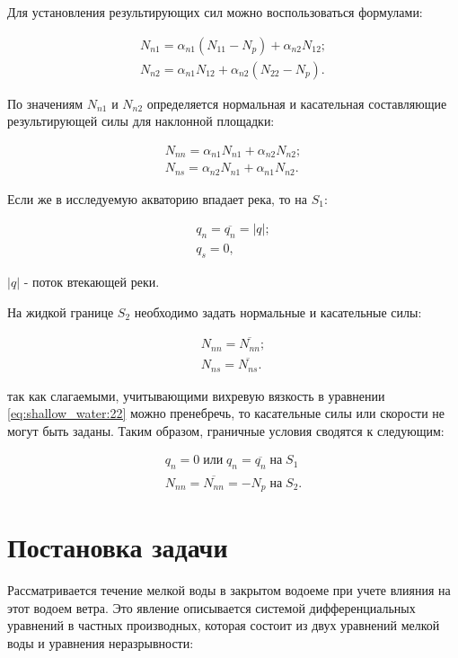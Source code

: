 \documentclass[14pt]{extreport}
\begin{document}
Для установления результирующих сил можно воспользоваться формулами:

\begin{eqnarray}
N_{n1}=\alpha_{n1}(N_{11}-N_{p})+\alpha_{n2}N_{12}; \nonumber\\
N_{n2}=\alpha_{n1}N_{12}+\alpha_{n2}(N_{22}-N_{p}).
\end{eqnarray}

По значениям $N_{n1}$ и $N_{n2}$ определяется нормальная и касательная составляющие результирующей силы для наклонной площадки:

\begin{eqnarray}
N_{nn}=\alpha_{n1}N_{n1}+\alpha_{n2}N_{n2}; \nonumber\\
N_{ns}=\alpha_{n2}N_{n1}+\alpha_{n1}N_{n2}.
\end{eqnarray}

Если же в исследуемую акваторию впадает река, то на $S_1$:

\begin{eqnarray}
q_n=\overline{q_n}=|q|; \nonumber\\
q_s=0,
\end{eqnarray}

 $|q|$ - поток втекающей
реки. 

На жидкой границе $ S_2 $ необходимо задать нормальные и касательные силы:

\begin{eqnarray}
N_{nn}=\overline{N_{nn}}; \nonumber\\
N_{ns}=\overline{N_{ns}}.
\end{eqnarray}

 так как слагаемыми, учитывающими вихревую вязкость в уравнении \ref{eq:shallow_water:22} можно пренебречь, то касательные силы или скорости не могут быть заданы. Таким образом, граничные условия сводятся к следующим:

\begin{eqnarray}
q_n=0 \; \text{или} \; q_n=\overline{q_n} \; \text{на} \; S_1\nonumber\\
N_{nn}=\overline{N_{nn}}=-N_p \; \text{на} \; S_2.
\end{eqnarray}

\chapter{Постановка задачи}

Рассматривается течение мелкой воды в закрытом водоеме при учете влияния на этот водоем ветра. Это явление описывается системой дифференциальных уравнений в частных производных\cite{bib:calc:yurko:2004}, которая состоит из двух уравнений мелкой воды и уравнения неразрывности:
\end{document}
